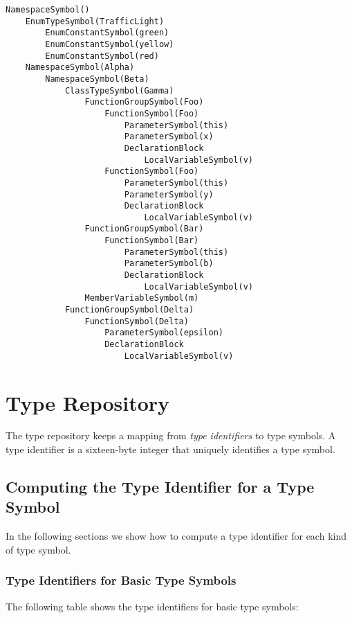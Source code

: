 \documentclass[a4paper,oneside,11pt]{book}
\theoremstyle{definition}
\begin{document}
\begin{verbatim}
NamespaceSymbol()
    EnumTypeSymbol(TrafficLight)
        EnumConstantSymbol(green)
        EnumConstantSymbol(yellow)
        EnumConstantSymbol(red)
    NamespaceSymbol(Alpha)
        NamespaceSymbol(Beta)
            ClassTypeSymbol(Gamma)
                FunctionGroupSymbol(Foo)
                    FunctionSymbol(Foo)
                        ParameterSymbol(this)
                        ParameterSymbol(x)
                        DeclarationBlock
                            LocalVariableSymbol(v)
                    FunctionSymbol(Foo)
                        ParameterSymbol(this)
                        ParameterSymbol(y)
                        DeclarationBlock
                            LocalVariableSymbol(v)
                FunctionGroupSymbol(Bar)
                    FunctionSymbol(Bar)
                        ParameterSymbol(this)
                        ParameterSymbol(b)
                        DeclarationBlock
                            LocalVariableSymbol(v)
                MemberVariableSymbol(m)
            FunctionGroupSymbol(Delta)
                FunctionSymbol(Delta)
                    ParameterSymbol(epsilon)
                    DeclarationBlock
                        LocalVariableSymbol(v)
\end{verbatim}

\chapter{Type Repository}

The type repository keeps a mapping from \emph{type identifiers} to type symbols.
A type identifier is a sixteen-byte integer that uniquely identifies a type symbol.

\section{Computing the Type Identifier for a Type Symbol}

In the following sections we show how to compute a type identifier for each kind of type symbol.

\subsection{Type Identifiers for Basic Type Symbols}

The following table shows the type identifiers for basic type symbols:
\end{document}
